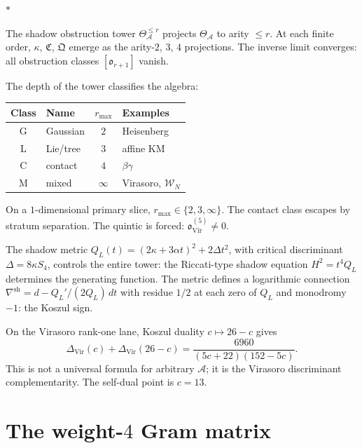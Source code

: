 \documentclass[11pt]{article}
\newcommand{\cA}{\mathcal{A}}
\newcommand{\cW}{\mathcal{W}}
\newcommand{\sep}{\bigskip\begin{center}$*$\end{center}\medskip}
\begin{document}
\sep

The shadow obstruction tower $\Theta_\cA^{\leq r}$ projects
$\Theta_\cA$ to arity $\leq r$.  At each finite order,
$\kappa$, $\mathfrak{C}$, $\mathfrak{Q}$ emerge as the arity-$2$,
$3$, $4$ projections.  The inverse limit converges:
all obstruction classes $[\mathfrak{o}_{r+1}]$ vanish.

The depth of the tower classifies the algebra:

\medskip
\begin{center}
\small
\renewcommand{\arraystretch}{1.2}
\begin{tabular}{clcl}
\textbf{Class} & \textbf{Name} & $r_{\max}$ & \textbf{Examples} \\ \hline
G & Gaussian & $2$ & Heisenberg \\
L & Lie/tree & $3$ & affine KM \\
C & contact & $4$ & $\beta\gamma$ \\
M & mixed & $\infty$ & Virasoro, $\cW_N$
\end{tabular}
\end{center}

\medskip

On a $1$-dimensional primary slice,
$r_{\max} \in \{2, 3, \infty\}$.  The contact class
escapes by stratum separation.  The quintic is forced:
$\mathfrak{o}^{(5)}_{\mathrm{Vir}} \neq 0$.

The shadow metric $Q_L(t) = (2\kappa + 3\alpha t)^2 + 2\Delta t^2$,
with critical discriminant $\Delta = 8\kappa S_4$, controls the
entire tower: the Riccati-type shadow equation
$H^2 = t^4 Q_L$ determines the generating function.  The metric
defines a logarithmic connection
$\nabla^{\mathrm{sh}} = d - Q_L'/(2Q_L)\,dt$ with residue $1/2$
at each zero of $Q_L$ and monodromy $-1$: the Koszul sign.

On the Virasoro rank-one lane, Koszul duality
$c\mapsto 26-c$ gives
\[
\Delta_{\mathrm{Vir}}(c)+\Delta_{\mathrm{Vir}}(26-c)
= \frac{6960}{(5c+22)(152-5c)}.
\]
This is not a universal formula for arbitrary $\cA$; it is the
Virasoro discriminant complementarity.  The self-dual point is
$c=13$.


\section{The weight-$4$ Gram matrix}
\label{sec:gram}
\end{document}
